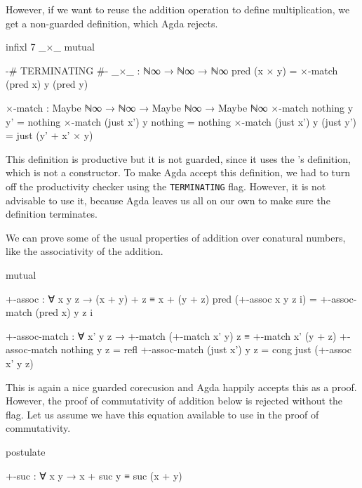 However, if we want to reuse the addition operation to define multiplication, we
get a non-guarded definition, which Agda rejects.

\begin{code}[hide]
infixl 7 _×_
mutual
\end{code}
\begin{code}
  {-# TERMINATING #-}
  _×_ : ℕ∞ → ℕ∞ → ℕ∞
  pred (x × y) = ×-match (pred x) y (pred y)

  ×-match :
    Maybe ℕ∞ → ℕ∞ → Maybe ℕ∞ → Maybe ℕ∞
  ×-match nothing    y y'         = nothing
  ×-match (just x')  y nothing    = nothing
  ×-match (just x')  y (just y')  = just (y' + x' × y)
\end{code}

This definition is productive but it is not guarded, since it uses the
\AgdaFunction{\_+\_}'s definition, which is not a constructor. To make Agda
accept this definition, we had to turn off the productivity checker using the
\texttt{TERMINATING} flag. However, it is not advisable to use it, because Agda
leaves us all on our own to make sure the definition terminates.

We can prove some of the usual properties of addition over conatural numbers,
like the associativity of the addition.

\begin{code}[hide]
mutual
\end{code}
\begin{code}
  +-assoc : ∀ x y z → (x + y) + z ≡ x + (y + z)
  pred (+-assoc x y z i) = +-assoc-match (pred x) y z i

  +-assoc-match :
    ∀ x' y z →
    +-match (+-match x' y) z ≡ +-match x' (y + z)
  +-assoc-match nothing    y z = refl
  +-assoc-match (just x')  y z = cong just (+-assoc x' y z)
\end{code}

This is again a nice guarded corecusion and Agda happily accepts this as a
proof. However, the proof of commutativity of addition below is rejected without
the  flag. Let us assume we have this equation
available to use in the proof of commutativity.

\begin{code}[hide]
postulate
\end{code}
\begin{code}
  +-suc : ∀ x y → x + suc y ≡ suc (x + y)
\end{code}

